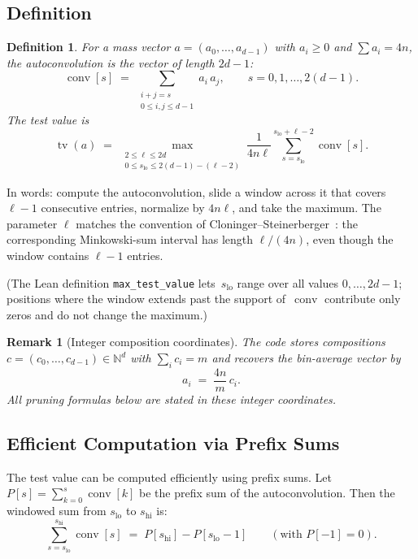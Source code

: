 \documentclass[11pt, letterpaper]{article}
\theoremstyle{paperplain}
\theoremstyle{paperdef}
\newtheorem{definition}[theorem]{Definition}
\newtheorem{remark}[theorem]{Remark}
\newcommand{\N}{\mathbb{N}}
\newcommand{\tv}{\operatorname{tv}}
\newcommand{\conv}{\operatorname{conv}}
\begin{document}
\subsection{Definition}

\begin{definition}
For a mass vector $a = (a_0, \ldots, a_{d-1})$ with $a_i \ge 0$ and
$\sum a_i = 4n$, the \emph{autoconvolution} is the vector of length
$2d - 1$:
\[
  \conv[s] \;=\; \sum_{\substack{i + j = s \\[1pt] 0 \le i,j \le d-1}}
  a_i\, a_j,
  \qquad s = 0, 1, \ldots, 2(d-1).
\]
The \emph{test value} is
\[
  \tv(a) \;=\;
  \max_{\substack{2 \le \ell \le 2d \\[2pt] 0 \le s_{\mathrm{lo}} \le 2(d-1) - (\ell-2)}}
  \frac{1}{4n\ell}
  \sum_{s=s_{\mathrm{lo}}}^{s_{\mathrm{lo}}+\ell-2} \conv[s].
\]
\end{definition}

In words: compute the autoconvolution, slide a window across it that
covers $\ell-1$ consecutive entries, normalize by $4n\ell$, and take
the maximum.  The parameter $\ell$ matches the convention of
Cloninger--Steinerberger~\cite{CS17}: the corresponding Minkowski-sum
interval has length $\ell/(4n)$, even though the window contains
$\ell-1$ entries.

(The Lean definition \texttt{max\_test\_value} lets~$s_{\mathrm{lo}}$
range over all values $0,\dots,2d-1$; positions where the window extends
past the support of~$\conv$ contribute only zeros and do not change the
maximum.)

\begin{remark}[Integer composition coordinates]
The code stores compositions
$c=(c_0,\ldots,c_{d-1}) \in \N^d$ with $\sum_i c_i = m$ and recovers
the bin-average vector by
\[
  a_i \;=\; \frac{4n}{m}\,c_i.
\]
All pruning formulas below are stated in these integer
coordinates.
\end{remark}

\subsection{Efficient Computation via Prefix Sums}

The test value can be computed efficiently using prefix sums.  Let
$P[s] = \sum_{k=0}^{s} \conv[k]$ be the prefix sum of the
autoconvolution.  Then the windowed sum from $s_{\mathrm{lo}}$ to
$s_{\mathrm{hi}}$ is:
\[
  \sum_{s=s_{\mathrm{lo}}}^{s_{\mathrm{hi}}} \conv[s]
  \;=\;
  P[s_{\mathrm{hi}}] - P[s_{\mathrm{lo}} - 1]
  \qquad (\text{with } P[-1] = 0).
\]
\end{document}
